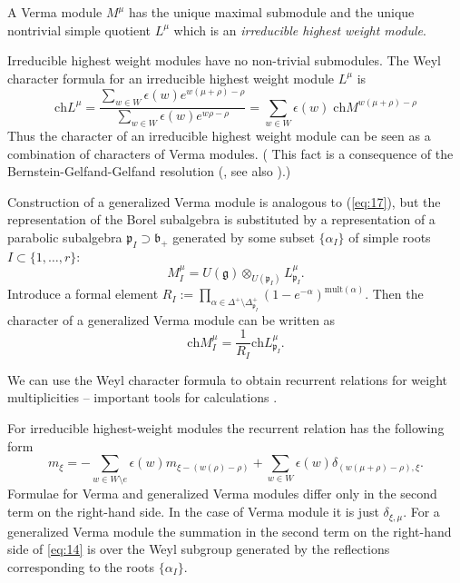 \documentclass[preprint,12pt]{elsarticle}
\newcommand{\gf}{\mathfrak{g}}
\newcommand{\bff}{\mathfrak{b}}
\newcommand{\pf}{\mathfrak{p}}
\begin{document}
A Verma module $M^{\mu}$ has the unique maximal submodule and the
unique nontrivial simple quotient $L^{\mu}$ which is an
{\it irreducible highest weight module}. 

Irreducible highest weight modules have no non-trivial submodules. 
The Weyl character formula for an irreducible highest weight module $L^{\mu}$ is
\begin{equation}
  \label{eq:13}
  \mathrm{ch} L^{\mu}=\frac{\sum_{w\in W} \epsilon(w) e^{w(\mu+\rho)-\rho}}{\sum_{w\in W}\epsilon(w) e^{w\rho-\rho}}=\sum_{w\in W} \epsilon(w)\; \mathrm{ch} M^{w(\mu+\rho)-\rho}
\end{equation}
Thus the character of an irreducible highest weight module can be
seen as a combination of characters of Verma modules. ( This
fact is a consequence of the Bernstein-Gelfand-Gelfand resolution
(\cite{bernstein1976category,bernstein1971structure}, see also
\cite{humphreys2008representations}).)

Construction of a generalized Verma module is analogous to (\ref{eq:17}), but the representation of the Borel subalgebra is substituted by a representation of a parabolic subalgebra $\pf_{I}\supset \bff_{+}$ generated by some subset $\{\alpha_{I}\}$ of simple roots $I\subset \{1,\dots, r\}$:
\begin{equation*}
M_{I}^{\mu}=U\left( \gf\right)\otimes _{U\left( \pf_{I}\right) }L_{\pf_{I}}^{\mu}.
\end{equation*}
Introduce a formal element $R_{I}:=\prod_{\alpha \in \Delta
^{+}\setminus \Delta _{\pf_{I}}^{+}}\left( 1-e^{-\alpha }\right)
^{\mathrm{mult}(\alpha )}$. Then the character of a generalized
Verma module can be written as
\begin{equation}
  \label{eq:18}
  \mathrm{ch}M_{I}^{\mu}=\frac{1}{R_{I}}\mathrm{ch}L_{\pf_{I}}^{\mu }.
\end{equation}



We can use the Weyl character formula to obtain recurrent relations for weight multiplicities -- important tools for calculations \cite{il2010folded,kulish4sfa}. 

For irreducible highest-weight modules the recurrent relation has the following form
\begin{equation}
\label{eq:14}
m_{\xi }=-\sum_{w\in W\setminus e}\epsilon (w)m_{\xi
-\left( w(\rho )-\rho \right) }+\sum_{w\in W}\epsilon
(w)\delta _{\left( w(\mu +\rho )-\rho \right) ,\xi }.
\end{equation}
Formulae for Verma and generalized Verma modules differ only in the second term on the right-hand side. In the case of Verma module it is just $\delta_{\xi,\mu}$. For a generalized Verma module the summation in the second term on the right-hand side of \eqref{eq:14} is over the Weyl subgroup generated by the reflections corresponding to the roots $\{\alpha_{I}\}$.
\end{document}
